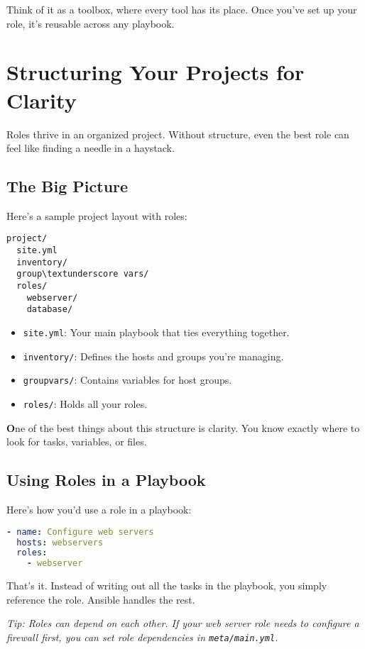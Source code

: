Think of it as a toolbox, where every tool has its place. Once you've set up your role, it's reusable across any playbook.

\section{Structuring Your Projects for Clarity}

Roles thrive in an organized project. Without structure, even the best role can feel like finding a needle in a haystack.

\subsection{The Big Picture}

Here's a sample project layout with roles:
\begin{verbatim}
project/
  site.yml
  inventory/
  group\textunderscore vars/
  roles/
    webserver/
    database/
\end{verbatim}

\begin{itemize}
    \item \texttt{site.yml}: Your main playbook that ties everything together.
    \item \texttt{inventory/}: Defines the hosts and groups you're managing.
    \item \texttt{group\textunderscore vars/}: Contains variables for host groups.
    \item \texttt{roles/}: Holds all your roles.
\end{itemize}

\textbf{O}ne of the best things about this structure is clarity. You know exactly where to look for tasks, variables, or files.

\subsection{Using Roles in a Playbook}

Here's how you'd use a role in a playbook:
\begin{lstlisting}[language=yaml, caption=Using a Role in a Playbook]
- name: Configure web servers
  hosts: webservers
  roles:
    - webserver
\end{lstlisting}

That's it. Instead of writing out all the tasks in the playbook, you simply reference the role. Ansible handles the rest.

\textit{Tip: Roles can depend on each other. If your web server role needs to configure a firewall first, you can set role dependencies in \texttt{meta/main.yml}.}

